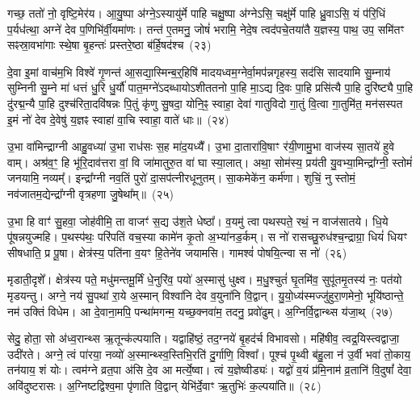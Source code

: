 गच्छ॒ ततो॑ नो॒ वृष्टि॒मेर॑य। आ॒यु॒ष्पा अ॑ग्ने॒\-ऽस्यायु॑र्मे पाहि चक्षु॒ष्पा अ॑ग्ने\-ऽसि॒ चक्षु॑र्मे पाहि ध्रु॒वा\-ऽसि॒ यं प॑रि॒धिं प॒र्यध॑त्था॒ अग्ने॑ देव प॒णिभि॑र्वी॒यमा॑णः। तन्त॑ ए॒तमनु॒ जोषं॑ भरामि॒ नेदे॒ष त्वद॑पचे॒तया॑तै य॒ज्ञस्य॒ पाथ॒ उप॒ समि॑तꣳ सꣴस्रा॒वभा॑गाः स्थे॒षा बृ॒हन्तः॑ प्रस्तरे॒ष्ठा ब॑र्\mbox{}हि॒षद॑श्च~(२३)

दे॒वा इ॒मां वाच॑म॒भि विश्वे॑ गृ॒णन्त॑ आ॒सद्या॒स्मिन्ब॒र्॒हिषि॑ मादयध्वम॒ग्नेर्वा॒मप॑न्नगृहस्य॒ सद॑सि सादयामि सु॒म्नाय॑ सुम्निनी सु॒म्ने मा॑ धत्तं धु॒रि धु॒र्यौ॑ पात॒मग्ने॑\-ऽदब्धायो\-ऽशीततनो पा॒हि मा॒\-ऽद्य दि॒वः पा॒हि प्रसि॑त्यै पा॒हि दुरि॑ष्ट्यै पा॒हि दु॑रद्म॒न्यै पा॒हि दुश्च॑रिता॒दवि॑षन्नः पि॒तुं कृ॑णु सु॒षदा॒ योनि॒ꣴ॒ स्वाहा॒ देवा॑ गातुविदो गा॒तुं वि॒त्वा गा॒तुमि॑त॒ मन॑सस्पत इ॒मं नो॑ देव दे॒वेषु॑ य॒ज्ञꣴ स्वाहा॑ वा॒चि स्वाहा॒ वाते॑ धाः॥~(२४)

{\anuvakamend[{दिव॑ञ्च वि॒त्वा गा॒तुन्त्रयो॑दश च}]}

उ॒भा वा॑मिन्द्राग्नी आहु॒वध्या॑ उ॒भा राध॑सः स॒ह मा॑द॒यध्यै᳚। उ॒भा दा॒तारा॑वि॒षाꣳ र॑यी॒णामु॒भा वाज॑स्य सा॒तये॑ हुवे वाम्। अश्र॑व॒ꣳ॒ हि भू॑रि॒दाव॑त्तरा वां॒ वि जा॑मातुरु॒त वा॑ घा स्या॒लात्। अथा॒ सोम॑स्य॒ प्रय॑ती यु॒वभ्या॒मिन्द्रा᳚ग्नी॒ स्तोमं॑ जनयामि॒ नव्यम्᳚। इन्द्रा᳚ग्नी नव॒तिं पुरो॑ दा॒सप॑त्नीरधूनुतम्। सा॒कमेके॑न॒ कर्म॑णा। शुचिं॒ नु स्तोमं॒ नव॑जातम॒द्येन्द्रा᳚ग्नी वृत्रहणा जु॒षेथा᳚म्॥~(२५)

उ॒भा हि वाꣳ॑ सु॒हवा॒ जोह॑वीमि॒ ता वाजꣳ॑ स॒द्य उ॑श॒ते धेष्ठा᳚। व॒यमु॑ त्वा पथस्पते॒ रथं॒ न वाज॑सातये। धि॒ये पू॑षन्नयुज्महि। प॒थस्प॑थः॒ परि॑पतिं वच॒स्या कामे॑न कृ॒तो अ॒भ्या॑नड॒र्कम्। स नो॑ रासच्छु॒रुध॑श्च॒न्द्राग्रा॒ धियं॑ धियꣳ सीषधाति॒ प्र पू॒षा। क्षेत्र॑स्य॒ पति॑ना व॒यꣳ हि॒तेने॑व जयामसि। गामश्वं॑ पोषयि॒त्न्वा स नो॑~(२६)

मृडाती॒दृशे᳚। क्षेत्र॑स्य पते॒ मधु॑मन्तमू॒र्मिं धे॒नुरि॑व॒ पयो॑ अ॒स्मासु॑ धुक्ष्व। म॒धु॒श्चुतं॑ घृ॒तमि॑व॒ सुपू॑तमृ॒तस्य॑ नः॒ पत॑यो मृडयन्तु। अग्ने॒ नय॑ सु॒पथा॑ रा॒ये अ॒स्मान् विश्वा॑नि देव व॒युना॑नि वि॒द्वान्। यु॒यो॒ध्य॑स्मज्जु॑हुरा॒णमेनो॒ भूयि॑ष्ठान्ते॒ नम॑ उक्तिं विधेम। आ दे॒वाना॒मपि॒ पन्था॑मगन्म॒ यच्छ॒क्नवा॑म॒ तदनु॒ प्रवो॑ढुम्। अ॒ग्निर्वि॒द्वान्थ्स य॑जा॒थ्~(२७)

सेदु॒ होता॒ सो अ॑ध्व॒रान्थ्स ऋ॒तून्क॑ल्पयाति। यद्वा\-हि॑ष्ठं॒ तद॒ग्नये॑ बृ॒हद॑र्च विभावसो। महि॑षीव॒ त्वद्र॒यिस्त्वद्वाजा॒ उदी॑रते। अग्ने॒ त्वं पा॑रया॒ नव्यो॑ अ॒स्मान्थ्स्व॒स्तिभि॒रति॑ दु॒र्गाणि॒ विश्वा᳚। पूश्च॑ पृ॒थ्वी ब॑हु॒ला न॑ उ॒र्वी भवा॑ तो॒काय॒ तन॑याय॒ शं योः। त्वम॑ग्ने व्रत॒पा अ॑सि दे॒व आ मर्त्ये॒ष्वा। त्वं य॒ज्ञेष्वीड्यः॑। यद्वो॑ व॒यं प्र॑मि॒नाम॑ व्र॒तानि॑ वि॒दुषां᳚ देवा॒ अवि॑दुष्टरासः। अ॒ग्निष्टद्विश्व॒मा पृ॑णाति वि॒द्वान् येभि॑र्दे॒वाꣳ ऋ॒तुभिः॑ क॒ल्पया॑ति॥~(२८)

